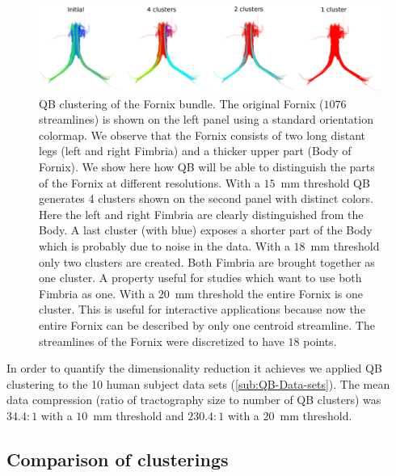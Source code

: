 \documentclass{bioinfo}
\begin{document}
\begin{methods}
\begin{figure}[htp]
\centerline{\includegraphics[width=160mm]{Figures/Fig_6_QB_fornix}}
\caption{QB clustering of the Fornix bundle. The original Fornix ($1076$
  streamlines) is shown on the left panel using a standard orientation
  colormap. We observe that the Fornix consists of two long distant legs
  (left and right Fimbria) and a thicker upper part (Body of Fornix). We
  show here how QB will be able to distinguish the parts of the Fornix
  at different resolutions. With a $15$~mm threshold QB generates 4
  clusters shown on the second panel with distinct colors. Here the left
  and right Fimbria are clearly distinguished from the Body. A last
  cluster (with blue) exposes a shorter part of the Body which is
  probably due to noise in the data. With a $18$~mm threshold only two
  clusters are created. Both Fimbria are brought together as one
  cluster. A property useful for studies which want to use both Fimbria
  as one. With a $20$~mm threshold the entire Fornix is one
  cluster. This is useful for interactive applications because now the
  entire Fornix can be described by only one centroid streamline. The
  streamlines of the Fornix were discretized to have $18$
  points.\label{Flo:QB_fornix}}
\end{figure}

In order to quantify the dimensionality reduction it achieves we applied
QB clustering to the 10 human subject data sets (\ref{sub:QB-Data-sets}). The mean
data compression (ratio of tractography size to number of QB clusters)
was $34.4:1$ with a $10$~mm threshold and $230.4:1$ with a $20$~mm
threshold.

\subsection{Comparison of clusterings\label{sub:Tightness-comparisons-1}}


\end{methods}
\end{document}
